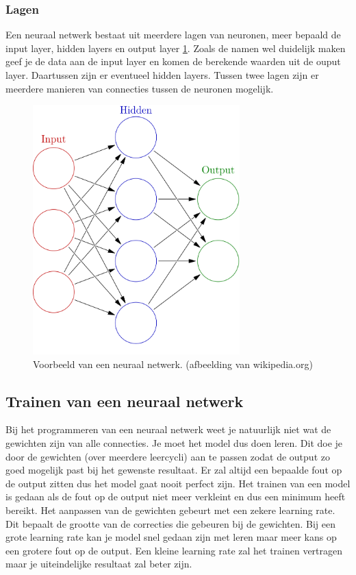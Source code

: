 \documentclass{article}
\begin{document}
\subsubsection{Lagen}
Een neuraal netwerk bestaat uit meerdere lagen van neuronen, meer bepaald de input layer, hidden layers en output layer \ref{netwerk}. Zoals de namen wel duidelijk maken geef je de data aan de input layer en komen de berekende waarden uit de ouput layer. Daartussen zijn er eventueel hidden layers. Tussen twee lagen zijn er meerdere manieren van connecties tussen de neuronen mogelijk.

\begin{figure}
	\begin{center}
		\includegraphics[width=8cm]{netwerk.png}
	\end{center}
	\caption{Voorbeeld van een neuraal netwerk. (afbeelding van wikipedia.org)}
	\label{netwerk}
\end{figure}

\subsection{Trainen van een neuraal netwerk}
Bij het programmeren van een neuraal netwerk weet je natuurlijk niet wat de gewichten zijn van alle connecties. Je moet het model dus doen leren. Dit doe je door de gewichten (over meerdere leercycli) aan te passen zodat de output zo goed mogelijk past bij het gewenste resultaat. Er zal altijd een bepaalde fout op de output zitten dus het model gaat nooit perfect zijn. Het trainen van een model is gedaan als de fout op de output niet meer verkleint en dus een minimum heeft bereikt. Het aanpassen van de gewichten gebeurt met een zekere learning rate. Dit bepaalt de grootte van de correcties die gebeuren bij de gewichten. Bij een grote learning rate kan je model snel gedaan zijn met leren maar meer kans op een grotere fout op de output. Een kleine learning rate zal het trainen vertragen maar je uiteindelijke resultaat zal beter zijn.
\end{document}

